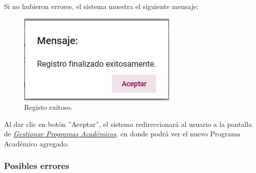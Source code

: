         Si no hubieron errores, el sistema muestra el siguiente mensaje:

        \begin{figure}[H]
            \centering
            \hypertarget{exito}{\includegraphics[width=0.7\linewidth]{images/SP3/Exitoso}}
            \caption{Registo exitoso.}
            \label{exito}
        \end{figure}

        Al dar clic  en botón ''Aceptar'', el sistema redireccionará al usuario a la pantalla de \hyperlink{consultarpa}{\textit{Gestionar Programas Académicos}}, en donde podrá ver el nuevo Programa Académico agregado.\\


        \subsubsection{Posibles errores}

